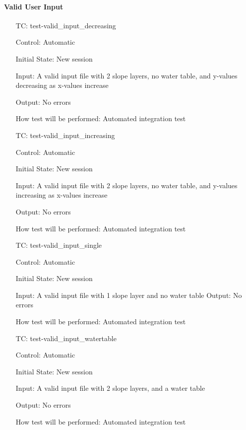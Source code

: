 \documentclass[12pt, titlepage]{article}
\newcounter{testnum} %
\begin{document}
\paragraph{Valid User Input}

\begin{enumerate}[label=TC\arabic*:,ref={\arabic*}]

\item [TC\refstepcounter{testnum}\thetestnum: \label{TC_ValidInDec}] 
test-valid\_input\_decreasing

Control: Automatic
					
Initial State: New session
					
Input: A valid input file with 2 slope layers, no water table, and y-values 
decreasing as x-values increase
					
Output: No errors

How test will be performed: Automated integration test
					
\item [TC\refstepcounter{testnum}\thetestnum: \label{TC_ValidInInc}] 
test-valid\_input\_increasing

Control: Automatic

Initial State: New session

Input: A valid input file with 2 slope layers, no water table, and y-values 
increasing as x-values increase

Output: No errors

How test will be performed: Automated integration test

\item [TC\refstepcounter{testnum}\thetestnum: \label{TC_ValidInOne}] 
test-valid\_input\_single

Control: Automatic

Initial State: New session

Input: A valid input file with 1 slope layer and no water table
Output: No errors

How test will be performed: Automated integration test

\item [TC\refstepcounter{testnum}\thetestnum: \label{TC_ValidInWT}] 
test-valid\_input\_watertable

Control: Automatic

Initial State: New session

Input: A valid input file with 2 slope layers, and a water table

Output: No errors

How test will be performed: Automated integration test

\end{enumerate}
\end{document}
